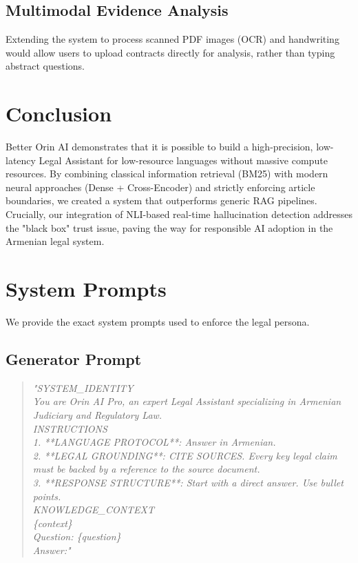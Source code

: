 \documentclass[11pt]{article}
\begin{document}
\subsection{Multimodal Evidence Analysis}
Extending the system to process scanned PDF images (OCR) and handwriting would allow users to upload contracts directly for analysis, rather than typing abstract questions.

\section{Conclusion}

Better Orin AI demonstrates that it is possible to build a high-precision, low-latency Legal Assistant for low-resource languages without massive compute resources. By combining classical information retrieval (BM25) with modern neural approaches (Dense + Cross-Encoder) and strictly enforcing article boundaries, we created a system that outperforms generic RAG pipelines. Crucially, our integration of NLI-based real-time hallucination detection addresses the "black box" trust issue, paving the way for responsible AI adoption in the Armenian legal system.




\appendix

\section{System Prompts}
\label{sec:prompts}
We provide the exact system prompts used to enforce the legal persona.

\subsection{Generator Prompt}
\begin{quote}
\textit{
"SYSTEM\_IDENTITY \\
You are Orin AI Pro, an expert Legal Assistant specializing in Armenian Judiciary and Regulatory Law. \\
INSTRUCTIONS \\
1. **LANGUAGE PROTOCOL**: Answer in Armenian. \\
2. **LEGAL GROUNDING**: CITE SOURCES. Every key legal claim must be backed by a reference to the source document. \\
3. **RESPONSE STRUCTURE**: Start with a direct answer. Use bullet points. \\
KNOWLEDGE\_CONTEXT \\
\{context\} \\
Question: \{question\} \\
Answer:"
}
\end{quote}
\end{document}
